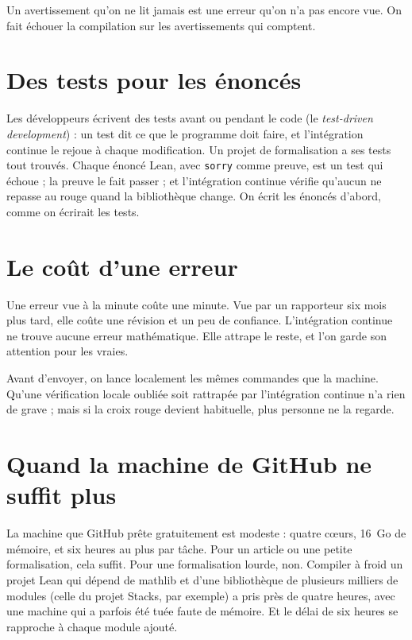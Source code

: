 \begin{regle}
Un avertissement qu'on ne lit jamais est une erreur qu'on n'a pas encore vue. On fait
échouer la compilation sur les avertissements qui comptent.
\end{regle}

\section{Des tests pour les énoncés}

Les développeurs écrivent des tests avant ou pendant le code (le \emph{test-driven
development}) : un test dit ce que le programme doit faire, et l'intégration continue le
rejoue à chaque modification. Un projet de formalisation a ses tests tout trouvés. Chaque
énoncé Lean, avec \texttt{sorry} comme preuve, est un test qui échoue ; la preuve le fait
passer ; et l'intégration continue vérifie qu'aucun ne repasse au rouge quand la
bibliothèque change. On écrit les énoncés d'abord, comme on écrirait les tests.

\section{Le coût d'une erreur}

Une erreur vue à la minute coûte une minute. Vue par un rapporteur six mois plus tard, elle
coûte une révision et un peu de confiance. L'intégration continue ne trouve aucune erreur
mathématique. Elle attrape le reste, et l'on garde son attention pour les vraies.

\begin{tipblock}
Avant d'envoyer, on lance localement les mêmes commandes que la machine. Qu'une vérification
locale oubliée soit rattrapée par l'intégration continue n'a rien de grave ; mais si la croix
rouge devient habituelle, plus personne ne la regarde.
\end{tipblock}

\section{Quand la machine de GitHub ne suffit plus}\label{sec:selfhosted}

La machine que GitHub prête gratuitement est modeste : quatre cœurs, 16~Go de mémoire, et six
heures au plus par tâche. Pour un article ou une petite formalisation, cela suffit. Pour une
formalisation lourde, non. Compiler à froid un projet Lean qui dépend de mathlib et d'une
bibliothèque de plusieurs milliers de modules (celle du projet Stacks, par exemple) a pris
près de quatre heures, avec une machine qui a parfois été tuée faute de mémoire. Et le délai
de six heures se rapproche à chaque module ajouté.

